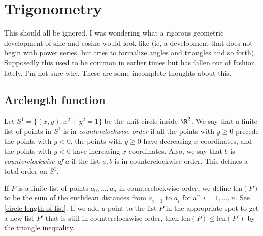 \chapter{Trigonometry}

{\color{blue} This should all be ignored. I was wondering what a rigorous geometric development of sine and cosine would look like (ie, a development that does not begin with power series, but tries to formalize angles and triangles and so forth). Supposedly this used to be common in earlier times but has fallen out of fashion lately. I'm not sure why. These are some incomplete thoughts about this.  }

\section{Arclength function}

\newcommand{\len}{\mathrm{len}}
\newcommand{\arclen}{\mathrm{arclen}}

Let $S^1 = \{ (x, y) : x^2 + y^2 = 1 \}$ be the unit circle inside $\R^2$. We say that a finite list of points in $S^1$ is in \emph{counterclockwise order} if all the points with $y \geq 0$ precede the points with $y < 0$, the points with $y \geq 0$ have decreasing $x$-coordinates, and the points with $y < 0$ have increasing $x$-coordinates. Also, we say that $b$ is \emph{counterclockwise of} $a$ if the list $a, b$ is in counterclockwise order. This defines a total order on $S^1$. 

If $P$ is a finite list of points $a_0, \dotsc, a_n$ in counterclockwise order, we define $\len(P)$ to be the sum of the euclidean distances from $a_{i-1}$ to $a_i$ for all $i = 1, \dotsc, n$. See \cref{circle-length-of-list}. If we add a point to the list $P$ in the appropriate spot to get a new list $P'$ that is still in counterclockwise order, then $\len(P) \leq \len(P')$ by the triangle inequality. 

